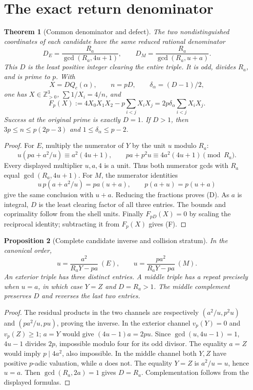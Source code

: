 \documentclass[11pt]{article}
\newtheorem{theorem}{Theorem}[section]
\newtheorem{proposition}[theorem]{Proposition}
\theoremstyle{definition}\newtheorem{definition}[theorem]{Definition}
\theoremstyle{remark}\newtheorem{remark}[theorem]{Remark}
\newcommand{\Z}{\mathbb Z}\newcommand{\Q}{\mathbb Q}\newcommand{\R}{\mathbb R}
\begin{document}
\section{The exact return denominator}
\begin{theorem}[Common denominator and defect]\label{thm:denom}
The two nondistinguished coordinates of each candidate have the same
reduced rational denominator
\[
 D_E=\frac{R_a}{\gcd(R_a,4u+1)},\qquad
 D_M=\frac{R_a}{\gcd(R_a,u+a)}.\tag{D}
\]
This $D$ is the least positive integer clearing the entire triple.
It is odd, divides $R_a$, and is prime to $p$. With
\[
 X=DQ_c(\alpha),\qquad n=pD,\qquad
 \delta_\alpha=(D-1)/2,
\]
one has $X\in\Z_{>0}^3$, $\sum 1/X_i=4/n$, and
\[
 F_p(X):=4X_0X_1X_2-p\sum_{i<j}X_iX_j
 =2p \delta_\alpha\sum_{i<j}X_iX_j.\tag{F}
\]
Success at the original prime is exactly $D=1$.
If $D>1$, then $3p\le n\le p(2p-3)$ and
$1\le \delta_\alpha\le p-2$.
\end{theorem}
\begin{proof}
For $E$, multiply the numerator of $Y$ by the unit $u$ modulo $R_a$:
\[
 u(pa+a^2/u)\equiv a^2(4u+1),\qquad
 pa+p^2u\equiv4a^2(4u+1)\pmod{R_a}.
\]
Every displayed multiplier $u,a,4$ is a unit. Thus both numerator gcds
with $R_a$ equal $\gcd(R_a,4u+1)$. For $M$, the numerator identities
\[
 u\,p(a+a^2/u)=pa(u+a),\qquad p(a+u)=p(u+a)
\]
give the same conclusion with $u+a$. Reducing the fractions proves (D).
As $a$ is integral, $D$ is the least clearing factor of all three entries.
The bounds and coprimality follow from the shell units. Finally
$F_{pD}(X)=0$ by scaling the reciprocal identity; subtracting it from
$F_p(X)$ gives (F).
\end{proof}

\begin{proposition}[Complete candidate inverse and collision stratum]
In the canonical order,
\[
 u=\frac{a^2}{R_aY-pa}\ (E),\qquad
 u=\frac{pa^2}{R_aY-pa}\ (M).
\]
An exterior triple has three distinct entries. A middle triple has a
repeat precisely when $u=a$, in which case $Y=Z$ and $D=R_a>1$.
The middle complement preserves $D$ and reverses the last two entries.
\end{proposition}
\begin{proof}
The residual products in the two channels are respectively
$(a^2/u,p^2u)$ and $(pa^2/u,pu)$, proving the inverse.
In the exterior channel $v_p(Y)=0$ and $v_p(Z)\ge1$;
$a=Y$ would give $(4u-1)a=2pu$. Since $\gcd(u,4u-1)=1$,
$4u-1$ divides $2p$, impossible modulo four for its odd divisor.
The equality $a=Z$ would imply $p\mid4a^2$, also impossible.
In the middle channel both $Y,Z$ have positive $p$-adic valuation,
while $a$ does not. The equality $Y=Z$ is $a^2/u=u$, hence $u=a$.
Then $\gcd(R_a,2a)=1$ gives $D=R_a$.
Complementation follows from the displayed formulas.
\end{proof}
\end{document}
